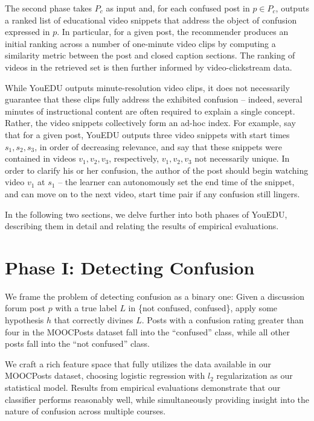 \documentclass{edm_template}
\begin{document}
The second phase takes $P_{c}$ as input and, for each confused post in $p \in P_{c}$, outputs a ranked list of educational video snippets that address the object of confusion expressed in $p$. In particular, for a given post, the recommender produces an initial ranking across a number of one-minute video clips by computing a similarity metric between the post and closed caption sections. The ranking of videos in the retrieved set is then further informed by video-clickstream data.

While YouEDU outputs minute-resolution video clips, it does not necessarily guarantee that these clips fully address the exhibited confusion -- indeed, several minutes of instructional content are often required to explain a single concept. Rather, the video snippets collectively form an ad-hoc index. For example, say that for a given post, YouEDU outputs three video snippets with start times $s_{1}, s_{2}, s_{3}$, in order of decreasing relevance, and say that these snippets were contained in videos $v_{1}, v_{2}, v_{3}$, respectively, $v_{1}, v_{2}, v_{3}$ not necessarily unique. In order to clarify his or her confusion, the author of the post should begin watching video $v_{1}$ at $s_{1}$ -- the learner can autonomously set the end time of the snippet, and can move on to the next video, start time pair if any confusion still lingers. 

In the following two sections, we delve further into both phases of YouEDU, describing them in detail and relating the results of empirical evaluations.

\section{Phase I: Detecting Confusion}
We frame the problem of detecting confusion as a binary one: Given a discussion forum post $p$ with a true label $L$ in \{not confused, confused\}, apply some hypothesis $h$ that correctly divines $L$. Posts with a confusion rating greater than four in the MOOCPosts dataset fall into the ``confused'' class, while all other posts fall into the ``not confused'' class.

We craft a rich feature space that fully utilizes the data available in our MOOCPosts dataset, choosing logistic regression with $l_{2}$ regularization as our statistical model. Results from empirical evaluations demonstrate that our classifier performs reasonably well, while simultaneously providing insight into the nature of confusion across multiple courses.
\end{document}
